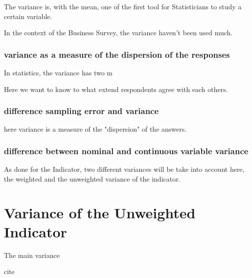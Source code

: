 \documentclass[12pt,a4paper,oneside]{book}
\begin{document}
The variance is, with the mean, one of the first tool for Statisticians to study a certain variable.

In the context of the Business Survey, the variance haven't been used much.

\subsubsection{variance as a measure of the dispersion of the responses}

In statistics, the variance has two m

Here we want to know to what extend respondents agree with each others.





\subsubsection{difference sampling error and variance}

here variance is a measure of the "dispersion" of the answers.

\subsubsection{difference between nominal and continuous variable variance}


As done for the Indicator, two different variances will be take into account here, the weighted and the unweighted variance of the indicator.


\section{Variance of the Unweighted Indicator}

The main variance

cite
\end{document}

